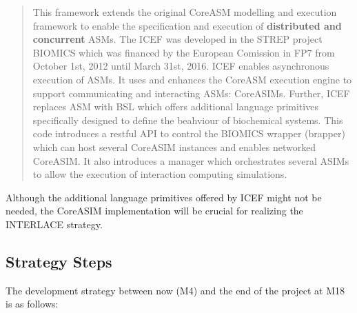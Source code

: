 \begin{quote}
\small
\vspace{-0.3cm}
This framework extends the original CoreASM modelling and execution framework to enable the specification and execution of \textbf{distributed and concurrent} ASMs. The ICEF was developed in the STREP project BIOMICS which was financed by the European Comission in FP7 from October 1st, 2012 until March 31st, 2016. ICEF enables asynchronous execution of ASMs. It uses and enhances the CoreASM execution engine to support communicating and interacting ASMs: CoreASIMs. Further, ICEF replaces ASM with BSL which offers additional language primitives specifically designed to define the beahviour of biochemical systems. This code introduces a restful API to control the BIOMICS wrapper (brapper) which can host several CoreASIM instances and enables networked CoreASIM. It also introduces a manager which orchestrates several ASIMs to allow the execution of interaction computing simulations.
\end{quote}

Although the additional language primitives offered by ICEF might not be needed, the CoreASIM implementation will be crucial for realizing the INTERLACE strategy.

\subsection{Strategy Steps}\label{subsection-strategy-steps}
The development strategy between now (M4) and the end of the project at M18 is as follows:

